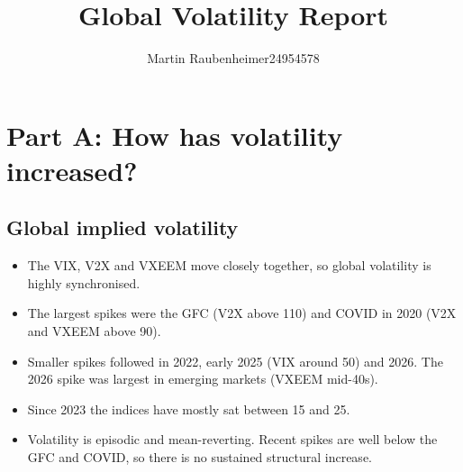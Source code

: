 \documentclass[11pt,preprint]{elsarticle}
\numberwithin{equation}{section}
\numberwithin{figure}{section}
\numberwithin{table}{section}
\def\tightlist{} %
\begin{document}
\begin{frontmatter}  %

\title{Global Volatility Report}





\author[Add1]{Martin Raubenheimer24954578}





\address[Add1]{Department of Economics, Stellenbosch University, South
Africa}



\vspace{1cm}





\vspace{0.5cm}

\end{frontmatter}

\setcounter{footnote}{0}



\pagestyle{fancy}
\chead{}
\rhead{}
\lfoot{}
\lhead{}
\cfoot{}


\headsep 35pt %




\section{Part A: How has volatility
increased?}\label{part-a-how-has-volatility-increased}

\subsection{Global implied volatility}\label{global-implied-volatility}

\begin{itemize}
\tightlist
\item
  The VIX, V2X and VXEEM move closely together, so global volatility is
  highly synchronised.
\item
  The largest spikes were the GFC (V2X above 110) and COVID in 2020 (V2X
  and VXEEM above 90).
\item
  Smaller spikes followed in 2022, early 2025 (VIX around 50) and 2026.
  The 2026 spike was largest in emerging markets (VXEEM mid-40s).
\item
  Since 2023 the indices have mostly sat between 15 and 25.
\item
  Volatility is episodic and mean-reverting. Recent spikes are well
  below the GFC and COVID, so there is no sustained structural increase.
\end{itemize}
\end{document}
